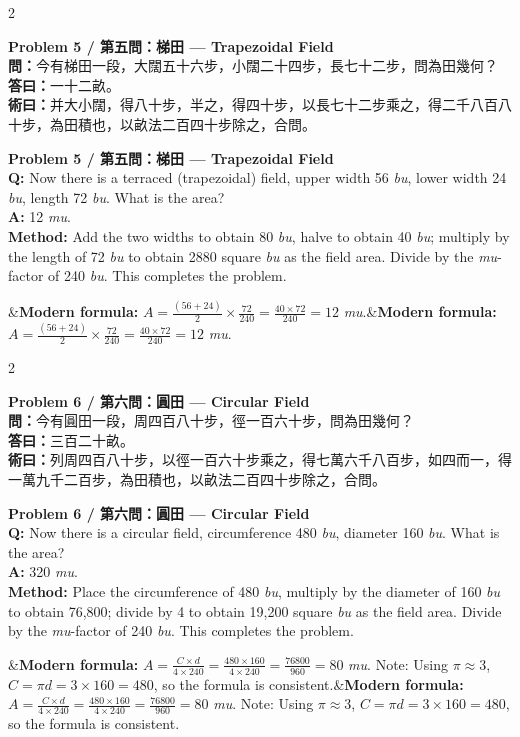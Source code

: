 \documentclass[11pt,a4paper]{article}
\newcommand{\bilingualproblem}[4]{%
  \begin{paracol}{2}
  \begin{leftcolumn}
  \noindent\textbf{\color{problemcolor}#1}\\[0.2cm]
  #2
  \end{leftcolumn}
  \switchcolumn
  \noindent\textbf{\color{problemcolor}#1}\\[0.2cm]
  #3
  \end{paracol}
  \ifx&#4&\else\vspace{0.3cm}\noindent#4\fi
  \vspace{0.5cm}
}
\newcommand{\wen}[1]{\textcolor{problemcolor}{\textbf{問：}}#1}
\newcommand{\da}[1]{\textcolor{answercolor}{\textbf{答曰：}}#1}
\newcommand{\shu}[1]{\textcolor{methodcolor}{\textbf{術曰：}}#1}
\newcommand{\wenen}[1]{\textcolor{problemcolor}{\textbf{Q:}} #1}
\newcommand{\daen}[1]{\textcolor{answercolor}{\textbf{A:}} #1}
\newcommand{\shuen}[1]{\textcolor{methodcolor}{\textbf{Method:}} #1}
\begin{document}
\bilingualproblem{Problem 5 / 第五問：梯田 --- Trapezoidal Field}{
\wen{今有梯田一段，大闊五十六步，小闊二十四步，長七十二步，問為田幾何？}\\[0.2cm]
\da{一十二畝。}\\[0.2cm]
\shu{并大小闊，得八十步，半之，得四十步，以長七十二步乘之，得二千八百八十步，為田積也，以畝法二百四十步除之，合問。}
}{
\wenen{Now there is a terraced (trapezoidal) field, upper width 56 \textit{bu}, lower width 24 \textit{bu}, length 72 \textit{bu}. What is the area?}\\[0.2cm]
\daen{12 \textit{mu}.}\\[0.2cm]
\shuen{Add the two widths to obtain 80 \textit{bu}, halve to obtain 40 \textit{bu}; multiply by the length of 72 \textit{bu} to obtain 2880 square \textit{bu} as the field area. Divide by the \textit{mu}-factor of 240 \textit{bu}. This completes the problem.}
}{\textbf{Modern formula:} $A = \frac{(56+24)}{2} \times \frac{72}{240} = \frac{40 \times 72}{240} = 12$ \textit{mu}.}

\bilingualproblem{Problem 6 / 第六問：圓田 --- Circular Field}{
\wen{今有圓田一段，周四百八十步，徑一百六十步，問為田幾何？}\\[0.2cm]
\da{三百二十畝。}\\[0.2cm]
\shu{列周四百八十步，以徑一百六十步乘之，得七萬六千八百步，如四而一，得一萬九千二百步，為田積也，以畝法二百四十步除之，合問。}
}{
\wenen{Now there is a circular field, circumference 480 \textit{bu}, diameter 160 \textit{bu}. What is the area?}\\[0.2cm]
\daen{320 \textit{mu}.}\\[0.2cm]
\shuen{Place the circumference of 480 \textit{bu}, multiply by the diameter of 160 \textit{bu} to obtain 76,800; divide by 4 to obtain 19,200 square \textit{bu} as the field area. Divide by the \textit{mu}-factor of 240 \textit{bu}. This completes the problem.}
}{\textbf{Modern formula:} $A = \frac{C \times d}{4 \times 240} = \frac{480 \times 160}{4 \times 240} = \frac{76800}{960} = 80$ \textit{mu}. Note: Using $\pi \approx 3$, $C = \pi d = 3 \times 160 = 480$, so the formula is consistent.}
\end{document}
